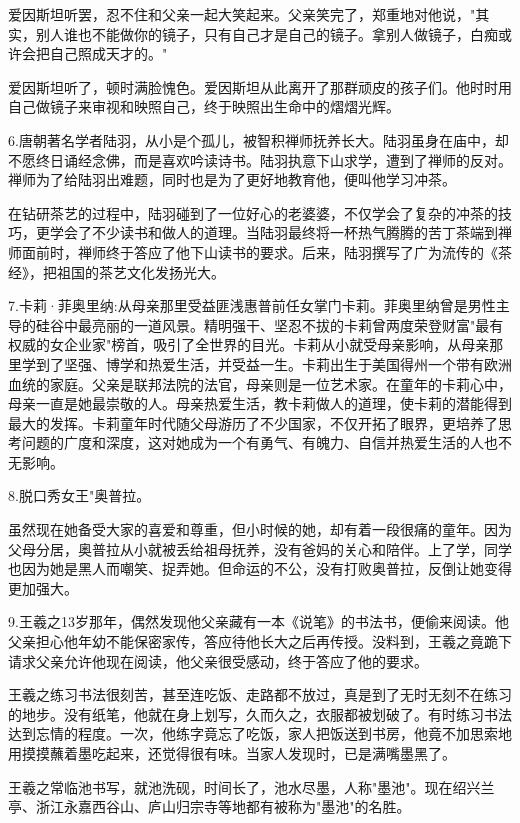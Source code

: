 \documentclass[UTF8]{ctexart}
\begin{document}
爱因斯坦听罢，忍不住和父亲一起大笑起来。父亲笑完了，郑重地对他说，"其实，别人谁也不能做你的镜子，只有自己才是自己的镜子。拿别人做镜子，白痴或许会把自己照成天才的。"\par
爱因斯坦听了，顿时满脸愧色。爱因斯坦从此离开了那群顽皮的孩子们。他时时用自己做镜子来审视和映照自己，终于映照出生命中的熠熠光辉。\par
6.唐朝著名学者陆羽，从小是个孤儿，被智积禅师抚养长大。陆羽虽身在庙中，却不愿终日诵经念佛，而是喜欢吟读诗书。陆羽执意下山求学，遭到了禅师的反对。禅师为了给陆羽出难题，同时也是为了更好地教育他，便叫他学习冲茶。\par
在钻研茶艺的过程中，陆羽碰到了一位好心的老婆婆，不仅学会了复杂的冲茶的技巧，更学会了不少读书和做人的道理。当陆羽最终将一杯热气腾腾的苦丁茶端到禅师面前时，禅师终于答应了他下山读书的要求。后来，陆羽撰写了广为流传的《茶经》，把祖国的茶艺文化发扬光大。\par
7.卡莉·菲奥里纳:从母亲那里受益匪浅惠普前任女掌门卡莉。菲奥里纳曾是男性主导的硅谷中最亮丽的一道风景。精明强干、坚忍不拔的卡莉曾两度荣登财富"最有权威的女企业家"榜首，吸引了全世界的目光。卡莉从小就受母亲影响，从母亲那里学到了坚强、博学和热爱生活，并受益一生。卡莉出生于美国得州一个带有欧洲血统的家庭。父亲是联邦法院的法官，母亲则是一位艺术家。在童年的卡莉心中，母亲一直是她最崇敬的人。母亲热爱生活，教卡莉做人的道理，使卡莉的潜能得到最大的发挥。卡莉童年时代随父母游历了不少国家，不仅开拓了眼界，更培养了思考问题的广度和深度，这对她成为一个有勇气、有魄力、自信并热爱生活的人也不无影响。\par
8.脱口秀女王"奥普拉。\par
虽然现在她备受大家的喜爱和尊重，但小时候的她，却有着一段很痛的童年。因为父母分居，奥普拉从小就被丢给祖母抚养，没有爸妈的关心和陪伴。上了学，同学也因为她是黑人而嘲笑、捉弄她。但命运的不公，没有打败奥普拉，反倒让她变得更加强大。\par
9.王羲之13岁那年，偶然发现他父亲藏有一本《说笔》的书法书，便偷来阅读。他父亲担心他年幼不能保密家传，答应待他长大之后再传授。没料到，王羲之竟跪下请求父亲允许他现在阅读，他父亲很受感动，终于答应了他的要求。\par
王羲之练习书法很刻苦，甚至连吃饭、走路都不放过，真是到了无时无刻不在练习的地步。没有纸笔，他就在身上划写，久而久之，衣服都被划破了。有时练习书法达到忘情的程度。一次，他练字竟忘了吃饭，家人把饭送到书房，他竟不加思索地用摸摸蘸着墨吃起来，还觉得很有味。当家人发现时，已是满嘴墨黑了。\par
王羲之常临池书写，就池洗砚，时间长了，池水尽墨，人称"墨池"。现在绍兴兰亭、浙江永嘉西谷山、庐山归宗寺等地都有被称为"墨池"的名胜。\par
\end{document}
